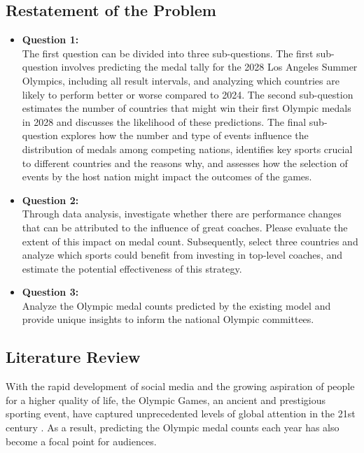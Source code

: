 \documentclass[12pt]{article}
\begin{document}
\subsection{Restatement of the Problem}
\begin{itemize}
  \item \textbf{Question 1:} \\
  The first question can be divided into three sub-questions. The first sub-question involves predicting the medal tally for the 2028 Los Angeles Summer Olympics, including all result intervals, and analyzing which countries are likely to perform better or worse compared to 2024. The second sub-question estimates the number of countries that might win their first Olympic medals in 2028 and discusses the likelihood of these predictions. The final sub-question explores how the number and type of events influence the distribution of medals among competing nations, identifies key sports crucial to different countries and the reasons why, and assesses how the selection of events by the host nation might impact the outcomes of the games.
  \item \textbf{Question 2:} \\
  Through data analysis, investigate whether there are performance changes that can be attributed to the influence of great coaches. Please evaluate the extent of this impact on medal count. Subsequently, select three countries and analyze which sports could benefit from investing in top-level coaches, and estimate the potential effectiveness of this strategy.
  
  \item \textbf{Question 3:} \\
  Analyze the Olympic medal counts predicted by the existing model and provide unique insights to inform the national Olympic committees.
\end{itemize}

\subsection{Literature Review}
\quad \quad With the rapid development of social media and the growing aspiration of people for a higher quality of life, the Olympic Games, an ancient and prestigious sporting event, have captured unprecedented levels of global attention in the 21st century \cite{grasso2015historical}. As a result, predicting the Olympic medal counts each year has also become a focal point for audiences.\\
\end{document}
